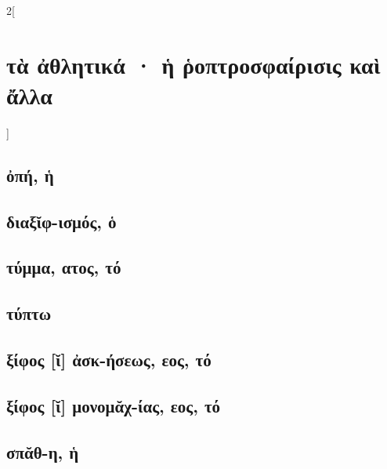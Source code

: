 \documentclass{book}
\begin{document}
\begin{multicols}{2}[\section{τὰ ἀθλητικά · ἡ ῥοπτροσφαίρισις καὶ ἄλλα}]
\subsection{ὀπή, ἡ}
\subsection{διαξῐφ-ισμός, ὁ}
\subsection{τύμμα, ατος, τό}
\subsection{τύπτω}
\subsection{ξίφος [ῐ] ἀσκ-ήσεως, εος, τό}
\subsection{ξίφος [ῐ] μονομᾰχ-ίας, εος, τό}
\subsection{σπᾰθ-η, ἡ}
~
\end{multicols}
\newpage  
\end{document}
